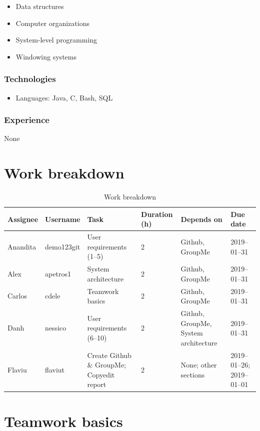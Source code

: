 \documentclass[
10pt, %
letterpaper, %
oneside, %
headinclude,footinclude, %
BCOR5mm, %
]{scrartcl}
\begin{document}
\begin{itemize}
\item
  Data structures
\item
  Computer organizations
\item
  System-level programming
\item
  Windowing systems
\end{itemize}

\subsubsection{Technologies}

\begin{itemize}
\item
  Languages: Java, C, Bash, SQL
\end{itemize}

\subsubsection{Experience}

None

\section{Work breakdown}

\begin{table}[H]
\begin{tabular}{@{}llp{3cm}p{1.2cm}p{2cm}p{2cm}@{}}
\toprule
Assignee & Username & Task & Duration (h) & Depends on & Due date\\ \midrule
Anandita & demo123git & User requirements (1--5) & 2 & Github, GroupMe & 2019--01--31\\
Alex & apetros1 & System architecture & 2 & Github, GroupMe & 2019--01--31\\
Carlos & cdele & Teamwork basics & 2 & Github, GroupMe & 2019--01--31\\
Danh & nessico & User requirements (6--10) & 2 & Github, GroupMe, System architecture & 2019--01--31\\
Flaviu & flaviut & Create Github \& GroupMe; Copyedit report & 2 & None; other sections & 2019--01--26; 2019--01--01\\ \bottomrule
\end{tabular}
\caption{Work breakdown}
\end{table}

\section{Teamwork basics}
\end{document}

